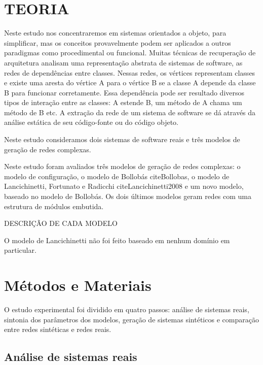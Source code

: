 \documentclass{acm_proc_article-sp}
\begin{document}

\section{TEORIA}

Neste estudo nos concentraremos em sistemas orientados a objeto, para simplificar, mas os conceitos provavelmente podem ser aplicados a outros paradigmas como procedimental ou funcional. 
Muitas técnicas de recuperação de arquitetura analisam uma representação abstrata de sistemas de software, as redes de dependências entre classes. Nessas redes, os vértices representam classes e existe uma aresta do vértice A para o vértice B se a classe A depende da classe B para funcionar corretamente. Essa dependência pode ser resultado diversos tipos de interação entre as classes: A estende B, um método de A chama um método de B etc.
A extração da rede de um sistema de software se dá através da análise estática de seu código-fonte ou do código objeto.

Neste estudo consideramos dois sistemas de software reais e três modelos de geração de redes complexas.

Neste estudo foram avaliados três modelos de geração de redes complexas: o modelo de configuração, o modelo de Bollobás citeBollobas, o modelo de Lancichinetti, Fortunato e Radicchi citeLancichinetti2008 e um novo modelo, baseado no modelo de Bollobás. Os dois últimos modelos geram redes com uma estrutura de módulos embutida.

DESCRIÇÃO DE CADA MODELO

O modelo de Lancichinetti não foi feito baseado em nenhum domínio em particular.

\section{Métodos e Materiais} %

O estudo experimental foi dividido em quatro passos: análise de sistemas reais, sintonia dos parâmetros dos modelos, geração de sistemas sintéticos e comparação entre redes sintéticas e redes reais. 

\subsection{Análise de sistemas reais}
\end{document}
